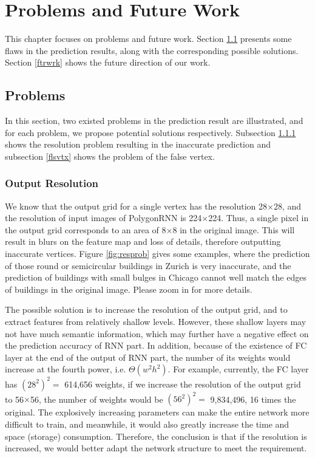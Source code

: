 \chapter{Problems and Future Work}\label{prbftr}
This chapter focuses on problems and future work. Section \ref{prblms} presents some flaws in the prediction results, along with the corresponding possible solutions. Section \ref{ftrwrk} shows the future direction of our work.

\section{Problems}\label{prblms}
In this section, two existed problems in the prediction result are illustrated, and for each problem, we propose potential solutions respectively. Subsection \ref{outres} shows the resolution problem resulting in the inaccurate prediction and subsection \ref{flsvtx} shows the problem of the false vertex.

\subsection{Output Resolution}\label{outres}
We know that the output grid for a single vertex has the resolution 28$\times$28, and the resolution of input images of PolygonRNN is 224$\times$224. Thus, a single pixel in the output grid corresponds to an area of 8$\times$8 in the original image. This will result in blurs on the feature map and loss of details, therefore outputting inaccurate vertices. Figure \ref{fig:resprob} gives some examples, where the prediction of those round or semicircular buildings in Zurich is very inaccurate, and the prediction of buildings with small bulges in Chicago cannot well match the edges of buildings in the original image. Please zoom in for more details.



The possible solution is to increase the resolution of the output grid, and to extract features from relatively shallow levels. However, these shallow layers may not have much semantic information, which may further have a negative effect on the prediction accuracy of RNN part. In addition, because of the existence of FC layer at the end of the output of RNN part, the number of its weights would increase at the fourth power, i.e. $\Theta(w^2h^2)$. For example, currently, the FC layer has $(28^2)^2 = $ 614,656 weights, if we increase the resolution of the output grid to 56$\times$56, the number of weights would be $(56^2)^2 = $ 9,834,496, 16 times the original. The explosively increasing parameters can make the entire network more difficult to train, and meanwhile, it would also greatly increase the time and space (storage) consumption. Therefore, the conclusion is that if the resolution is increased, we would better adapt the network structure to meet the requirement.

